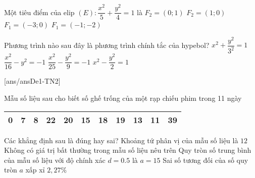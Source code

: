 \begin{ex}%
	Một tiêu điểm của elip $(E)\colon \dfrac{x^2}{5}+\dfrac{y^2}{4}=1$ là
	\choice
	{$F_2=(0;1)$}
	{\True $F_2=(1;0)$}
	{$F_1=(-3;0)$}
	{$F_1=(-1;-2)$}
\end{ex}

\begin{ex}%
	Phương trình nào sau đây là phương trình chính tắc của hypebol?
	\choice
	{$x^2+\dfrac{y^2}{3^2}=1$}
	{$\dfrac{x^2}{16}-y^2=-1$}
	{$\dfrac{x^2}{25}-\dfrac{y^2}{9}=-1$}
	{\True $x^2-\dfrac{y^2}{2}=1$}
\end{ex}

\TNTF
{}[ans/ansDe1-TN2]
\begin{ex}%
	Mẫu số liệu sau cho biết số ghế trống của một rạp chiếu phim trong 11 ngày
	\begin{center}
	\begin{tabular}{|l|l|l|l|l|l|l|l|l|l|l|}
	\hline 0 & 7 & 8 & 22 & 20 & 15 & 18 & 19 & 13 & 11 & 39 \\
	\hline
	\end{tabular}
	\end{center}
	Các khẳng định sau là đúng hay sai?
	\choiceTF
	{\True Khoảng tứ phân vị của mẫu số liệu là $12$}
	{Không có giá trị bất thường trong mẫu số liệu nêu trên}
	{Quy tròn số trung bình của mẫu số liệu với độ chính xác $d=0.5$ là $a=15$}
	{\True Sai số tương đối của số quy tròn $a$ xấp xỉ $2,27\%$}
	\end{ex}

